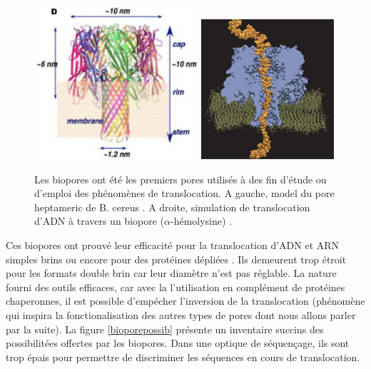 \begin{figure}[H]
\begin{center}
\includegraphics[width=0.54\textwidth]{bioporetoxine.png}
\includegraphics[width=0.44\textwidth]{biopore2.jpg}

\caption[Biopores]{Les biopores ont été les premiers pores utilisés à des fin d'étude ou d'emploi des phénomènes de translocation. A gauche, model du pore heptameric de B. cereus \cite{Ramarao2013}. A droite, simulation de translocation d'ADN à travers un biopore ($\alpha$-hémolysine) \cite{Aksimentiev2010}.}
\label{biopore}
\end{center}
\end{figure}

Ces biopores ont prouvé leur efficacité pour la translocation d'ADN et ARN simples brins ou encore pour des protéines dépliées \cite{Movileanu2005}. Ils demeurent trop étroit pour les formats double brin car leur diamètre n'est pas réglable. La nature fourni des outils efficaces, car avec la l'utilisation en complément de protéines chaperonnes, il est possible d'empécher l'inversion de la translocation \cite{DeLosRios2006} (phénomène qui inspira la fonctionalisation des autres types de pores dont nous allons parler par la suite). La figure \ref{bioporepossib} présente un inventaire succins des possibilitées offertes par les biopores. Dans une optique de séquençage, ils sont trop épais pour permettre de discriminer les séquences en cours de translocation.

